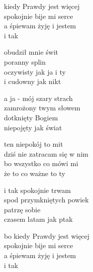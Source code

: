\begin{text}
    kiedy Prawdy jest więcej\\
    spokojnie bije mi serce\\
    a śpiewam żyję i jestem\\
    i tak

    obudził mnie świt\\
    poranny splin\\
    oczywisty jak ja i ty\\
    i cudowny jak nikt

    a ja - mój szary strach\\
    zamrożony twym słowem\\
    dotknięty Bogiem\\
    niepojęty jak świat

    ten niepokój to mit\\
    dziś nie zatracam się w nim\\
    bo wszystko co mówi mi\\
    że to co ważne to ty

    i tak spokojnie trwam\\
    spod przymkniętych powiek\\
    patrzę sobie\\
    czasem latam jak ptak

    bo kiedy Prawdy jest więcej\\
    spokojnie bije mi serce\\
    a śpiewam żyję i jestem\\
    i tak
\end{text}
\begin{chord}

\end{chord}